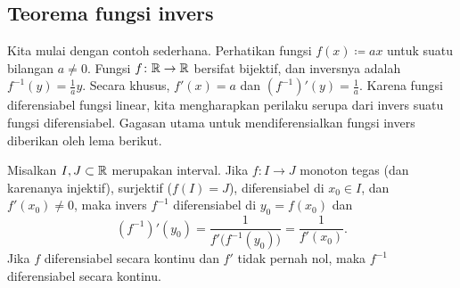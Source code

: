 \subsection{Teorema fungsi invers}

Kita mulai dengan contoh sederhana.  Perhatikan fungsi $f(x) \coloneqq a x$ untuk suatu
bilangan $a \neq 0$.  Fungsi $f \colon {\mathbb{R}} \to {\mathbb{R}}$ bersifat bijektif, dan inversnya
adalah $f^{-1}(y) = \frac{1}{a} y$.  Secara khusus, $f'(x) = a$ dan
$(f^{-1})'(y) = \frac{1}{a}$.  Karena fungsi diferensiabel
 fungsi linear, kita mengharapkan
perilaku serupa dari invers suatu fungsi diferensiabel.
Gagasan utama untuk mendiferensialkan fungsi invers diberikan oleh lema berikut.

\begin{lemma} \label{lemma:ift}
Misalkan $I,J \subset {\mathbb{R}}$ merupakan interval.
Jika $f \colon I \to J$ monoton tegas (dan karenanya injektif),
surjektif ($f(I) = J$),
diferensiabel di $x_0 \in I$, dan $f'(x_0) \neq 0$,
maka invers
$f^{-1}$ diferensiabel di $y_0 = f(x_0)$ dan
\begin{equation*}
(f^{-1})'(y_0) = \frac{1}{f'\bigl( f^{-1}(y_0) \bigr)} = \frac{1}{f'(x_0)} .
\end{equation*}
Jika $f$ diferensiabel secara kontinu dan $f'$ tidak pernah nol, maka $f^{-1}$
diferensiabel secara kontinu.
\end{lemma}

